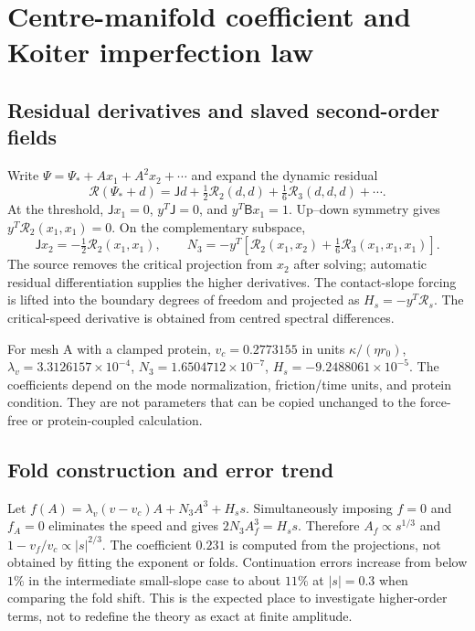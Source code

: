 \section{Centre-manifold coefficient and Koiter imperfection law}
\subsection{Residual derivatives and slaved second-order fields}
Write $\Psi=\Psi_*+Ax_1+A^2x_2+\cdots$ and expand the dynamic residual
\begin{equation}
\mathcal R(\Psi_*+d)=\mathsf Jd+\tfrac12\mathcal R_2(d,d)+\tfrac16\mathcal R_3(d,d,d)+\cdots .
\end{equation}
At the threshold, $\mathsf Jx_1=0$, $y^T\mathsf J=0$, and $y^T\mathsf Bx_1=1$. Up--down symmetry gives $y^T\mathcal R_2(x_1,x_1)=0$. On the complementary subspace,
\begin{equation}
\mathsf Jx_2=-\tfrac12\mathcal R_2(x_1,x_1),\qquad
N_3=-y^T\left[\mathcal R_2(x_1,x_2)+\tfrac16\mathcal R_3(x_1,x_1,x_1)\right].
\end{equation}
The source removes the critical projection from $x_2$ after solving; automatic residual differentiation supplies the higher derivatives. The contact-slope forcing is lifted into the boundary degrees of freedom and projected as $H_s=-y^T\mathcal R_s$. The critical-speed derivative is obtained from centred spectral differences.

For mesh A with a clamped protein, $v_c=0.2773155$ in units $\kappa/(\eta r_0)$, $\lambda_v=3.3126157\times10^{-4}$, $N_3=1.6504712\times10^{-7}$, $H_s=-9.2488061\times10^{-5}$. The coefficients depend on the mode normalization, friction/time units, and protein condition. They are not parameters that can be copied unchanged to the force-free or protein-coupled calculation.

\subsection{Fold construction and error trend}
Let $f(A)=\lambda_v(v-v_c)A+N_3A^3+H_s s$. Simultaneously imposing $f=0$ and $f_A=0$ eliminates the speed and gives $2N_3A_f^3=H_s s$. Therefore $A_f\propto s^{1/3}$ and $1-v_f/v_c\propto|s|^{2/3}$. The coefficient $0.231$ is computed from the projections, not obtained by fitting the exponent or folds. Continuation errors increase from below $1\%$ in the intermediate small-slope case to about $11\%$ at $|s|=0.3$ when comparing the fold shift. This is the expected place to investigate higher-order terms, not to redefine the theory as exact at finite amplitude.

